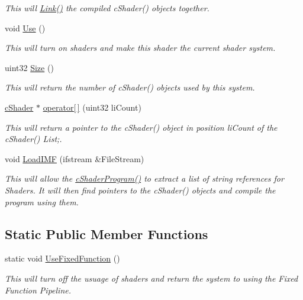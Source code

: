 \begin{DoxyCompactItemize}
\begin{DoxyCompactList}\small\item\em This will \hyperlink{classc_shader_program_a2e6bc46c158959bcea66b4e321416b72}{Link()} the compiled cShader() objects together. \item\end{DoxyCompactList}\item 
void \hyperlink{classc_shader_program_a875d9dca579f3b2ea1d81b65faf80738}{Use} ()
\begin{DoxyCompactList}\small\item\em This will turn on shaders and make this shader the current shader system. \item\end{DoxyCompactList}\item 
uint32 \hyperlink{classc_shader_program_a1f3e7bf1c63c0bde8e537981ed555933}{Size} ()
\begin{DoxyCompactList}\small\item\em This will return the number of cShader() objects used by this system. \item\end{DoxyCompactList}\item 
\hyperlink{classc_shader}{cShader} $\ast$ \hyperlink{classc_shader_program_a1a75e17e0116f72f0079c6097f66ac22}{operator\mbox{[}$\,$\mbox{]}} (uint32 liCount)
\begin{DoxyCompactList}\small\item\em This will return a pointer to the cShader() object in position liCount of the cShader() List;. \item\end{DoxyCompactList}\item 
void \hyperlink{classc_shader_program_ac8f1caa093d9651daf5e303e877ed47d}{LoadIMF} (ifstream \&FileStream)
\begin{DoxyCompactList}\small\item\em This will allow the \hyperlink{classc_shader_program_ab032906ae85885362543784fea60cc87}{cShaderProgram()} to extract a list of string references for Shaders. It will then find pointers to the cShader() objects and compile the program using them. \item\end{DoxyCompactList}\end{DoxyCompactItemize}
\subsection*{Static Public Member Functions}
\begin{DoxyCompactItemize}
\item 
static void \hyperlink{classc_shader_program_ae17497a7f5f41dca55671be34994ed22}{UseFixedFunction} ()
\begin{DoxyCompactList}\small\item\em This will turn off the usuage of shaders and return the system to using the Fixed Function Pipeline. \item\end{DoxyCompactList}\end{DoxyCompactItemize}


